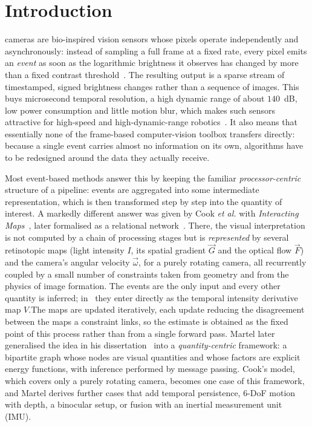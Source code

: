 \documentclass[journal]{IEEEtran}
\newcommand{\Imap}{I}
\newcommand{\Vmap}{V}
\newcommand{\Gmap}{\vec{G}}
\newcommand{\Fmap}{\vec{F}}
\newcommand{\wvec}{\vec{\omega}}
\begin{document}
\IEEEpeerreviewmaketitle


\section{Introduction}

 cameras are bio-inspired vision sensors whose pixels
operate independently and asynchronously: instead of sampling a full frame at a
fixed rate, every pixel emits an \emph{event} as soon as the logarithmic
brightness it observes has changed by more than a fixed contrast
threshold~\cite{lichtsteiner2008}. The resulting output is a sparse stream of
timestamped, signed brightness changes rather than a sequence of images. This
buys microsecond temporal resolution, a high dynamic range of about $140$~dB, low
power consumption and little motion blur, which makes such sensors
attractive for high-speed and high-dynamic-range robotics~\cite{gallego2022survey}.
It also means that essentially none of the frame-based computer-vision toolbox
transfers directly: because a single event carries almost no information on its
own, algorithms have to be redesigned around the data they actually receive.

Most event-based methods answer this by keeping the familiar
\emph{processor-centric} structure of a pipeline: events are aggregated into some
intermediate representation, which is then transformed step by step into the
quantity of interest. A markedly different answer was given by Cook \emph{et al.}
with \emph{Interacting Maps}~\cite{cook2011}, later formalised as a relational
network~\cite{martel2015relational}. There, the visual interpretation is
not computed by a chain of processing stages but is \emph{represented} by several
retinotopic maps (light intensity $\Imap$, its spatial gradient $\Gmap$ and the
optical flow $\Fmap$) and the camera's angular velocity $\wvec$, for a purely
rotating camera, all recurrently coupled by a small number of constraints taken from geometry and from
the physics of image formation. The events are the only input and every other quantity is inferred; in~\cite{cook2011} they enter directly as the temporal intensity derivative map $\Vmap$.The maps are updated iteratively, each update reducing the disagreement between the maps a constraint links, so the estimate is obtained as the fixed point of this process rather than from a single forward pass. Martel later generalised the idea in his
dissertation~\cite{martel2019thesis} into a
\emph{quantity-centric} framework: a bipartite graph whose nodes are visual
quantities and whose factors are explicit energy functions, with inference
performed by message passing. Cook's model, which covers only a purely rotating camera, becomes one case of this framework, and Martel derives further cases that add temporal persistence, 6-DoF motion with depth, a binocular setup, or fusion with an inertial measurement unit (IMU).
\end{document}
